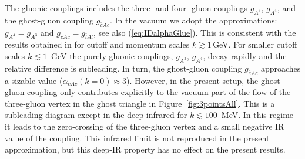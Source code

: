 \documentclass[%
reprint,
superscriptaddress,
showpacs,preprintnumbers,
 amsmath,amssymb,
 aps,
prd,
]{revtex4-1}
\def\eq#1{(\ref{#1})}
\def\fig#1{Figure~\ref{#1}}
\begin{document}
The gluonic couplings includes the three- and four- gluon couplings
$g_{A^3}$, $g_{A^4}$, and the ghost-gluon coupling $g_{\bar{c} A
  c}$. In the vacuum we adopt the approximations: $g_{A^4}=g_{A^3}$
and $g_{\bar{c}A c }=g_{\bar{l}A l }$, see also
\eq{eq:IDalphaGlue}. This is consistent with the results obtained in
\cite{Cyrol:2017ewj,Braun:2014ata} for cutoff and momentum scales
$k\gtrsim 1$\,GeV. For smaller cutoff scales $k\lesssim 1$\, GeV the
purely gluonic couplings, $g_{A^3}$, $g_{A^4}$, decay rapidly and the
relative difference is subleading. In turn, the ghost-gluon coupling
$g_{\bar{c}A c }$ approaches a sizable value
($\alpha_{\bar{c}A c }(k=0) \approx 3$). However, in the present
setup, the ghost-gluon coupling only contributes explicitly to the
vacuum part of the flow of the three-gluon vertex in the ghost
triangle in \fig{fig:3pointsAll}. This is a subleading diagram except
in the deep infrared for $k\lesssim 100$\, MeV. In this regime it
leads to the zero-crossing of the three-gluon vertex and a small
negative IR value of the coupling. This infrared limit is not
reproduced in the present approximation, but this deep-IR property has
no effect on the present results.
\end{document}
